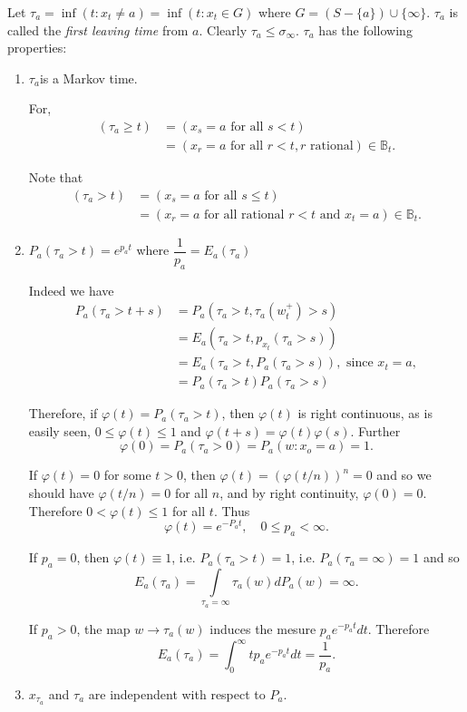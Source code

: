 Let $\tau_a = \inf (t : x_t \neq a) = \inf (t : x_t \in G)$
where $G= (S - \{a\} ) \cup \{\infty\}$. $\tau_{a}$ is called the 
\textit{first leaving time} from $a$. Clearly $\tau_a \leq
\sigma_\infty$. $\tau_a$ has the following properties: 
\begin{enumerate}
\item $\tau_a$\pageoriginale is a Markov time.

For,
  \begin{align*}
(\tau_a \ge t) &= (x_{s}=a \text{ for all } s < t)\\
    & = (x_r = a \text{ for all } r <t, r \text{  rational})
    \in \mathbb{B}_t. 
  \end{align*}

Note that
\begin{align*}
  (\tau_a > t) & = (x_s = a \text{ for all } s \le t)\\
  & = (x_r = a \text{ for all rational } r < t \text{ and } x_t =a)
  \in \mathbb{B}_t. 
\end{align*}

\item $P_a (\tau_a > t) = e^{p_at}$ where $\dfrac{1}{p_a} = E_a (\tau_a)$

Indeed we have
  \begin{align*}
    P_a (\tau_a > t+s) & = P_a (\tau_a > t, \tau_a (w^+_t) > s)\\
    & = E_a (\tau_a > t, p_{x_{t}} (\tau_a > s))\\
    & = E_a (\tau_a > t, P_a (\tau_a > s)), \text{ since }  x_t = a,\\
    & = P_a (\tau_a >t) P_a (\tau_a >s)
  \end{align*}

  Therefore, if $\varphi (t) = P_a (\tau_a > t)$, then $\varphi (t)$
  is right continuous, as is easily seen, $0 \le \varphi (t) \le 1$
  and $\varphi (t+s) = \varphi (t) \varphi (s)$. Further 
  $$
  \varphi (0) = P_a (\tau_a > 0) = P_a (w:x_o = a) = 1.
  $$

  If $\varphi (t) = 0$ for some $t >0$, then $\varphi (t) = (\varphi
  (t /n))^n = 0$ and so we should have $\varphi (t/n) = 0$ for all
  $n$, and by right continuity, $\varphi (0) = 0$.\pageoriginale 
Therefore $0 < \varphi (t) \leq 1$ for all $t$. Thus  
  $$
  \varphi (t) = e^{-P_at},\quad 0 \le p_a < \infty.
  $$

  If $p_a = 0$, then $\varphi (t) \equiv 1$, i.e. $P_a (\tau_a > t) =
  1$, i.e. $P_a (\tau_a = \infty) = 1$ and so 
  $$
  E_a (\tau_a) = \int\limits_{\tau_a = \infty} \tau_a (w) dP_a (w) = \infty.
  $$
  
  If $p_a > 0$, the map $w \to \tau_a (w)$ induces the mesure $p_a
  e^{-p_at} dt$. Therefore 
  $$
  E_a (\tau_a) = \int^\infty_0 tp_a e^{-p_at} dt = \frac{1}{p_a}.
  $$

\item $x_{\tau_{a}}$ and $\tau_a$ are independent with respect to $P_a$.
\end{enumerate}

